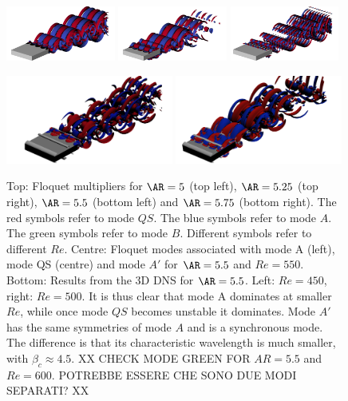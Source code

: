 \documentclass[onecolumn,notitlepage,superscriptaddress, amsmath,amssymb,longbibliographyaps,floatfix]{revtex4-1}
\begin{document}
\begin{figure}
\begin{tikzpicture}
  \end{tikzpicture}
  \vspace{0.1cm}
  \includegraphics[width=0.32\textwidth]{./fig/AR5s/Floqetmode_beta_2_Re550_AR5p5_A.png}
  \includegraphics[width=0.32\textwidth]{./fig/AR5s/Floqetmode_beta_2_Re550_AR5p5_QS.png} 
  \includegraphics[width=0.32\textwidth]{./fig/AR5s/Floqetmode_beta_4p75_Re550_AR5p5_Ap.png}
  \vspace{0.1cm}
  \vspace{0.1cm}
  \includegraphics[width=0.49\textwidth]{./fig/AR5s/lambda2-AR55-Re450-3D.png}   
  \includegraphics[width=0.49\textwidth]{./fig/AR5s/lambda2-AR55-Re500-3D.png}     
  \caption{Top: Floquet multipliers for $\AR=5$ (top left), $\AR=5.25$ (top right), $\AR=5.5$ (bottom left) and $\AR=5.75$ (bottom right). The red symbols refer to mode $QS$. The blue symbols refer to mode $A$. The green symbols refer to mode $B$. Different symbols refer to different $Re$. Centre: Floquet modes associated with mode A (left), mode QS (centre) and mode $A'$ for $\AR=5.5$ and $Re=550$. Bottom: Results from the 3D DNS for $\AR=5.5$. Left: $Re=450$, right: $Re=500$. It is thus clear that mode A dominates at smaller $Re$, while once mode $QS$ becomes unstable it dominates. Mode $A'$ has the same symmetries of mode $A$ and is a synchronous mode. The difference is that its characteristic wavelength is much smaller, with $\beta_c \approx 4.5$. XX CHECK MODE GREEN FOR $AR=5.5$ and $Re=600$. POTREBBE ESSERE CHE SONO DUE MODI SEPARATI? XX}
  \label{fig:mult_AR5s}
\end{figure} 
\end{document}
